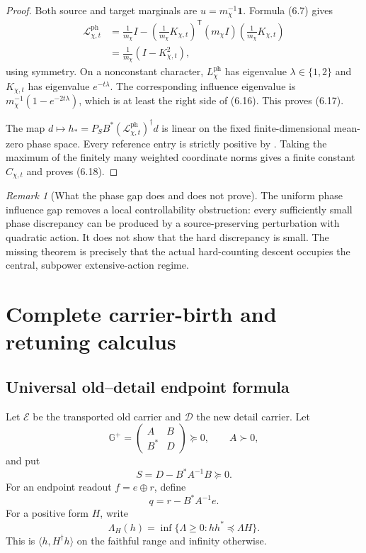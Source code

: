 \documentclass[11pt]{article}
\theoremstyle{definition}
\theoremstyle{remark}
\newtheorem{remark}[theorem]{Remark}
\newcommand{\one}{\mathbf 1}
\newcommand{\Phase}{\mathrm{ph}}
\begin{document}
\begin{proof}
Both source and target marginals are $u=m_\chi^{-1}\one$.  Formula
\textup{(6.7)} gives
\[
 \begin{aligned}
 \mathcal L_{\chi,t}^{\Phase}
 &=\frac1{m_\chi}I
  -\left(\frac1{m_\chi}K_{\chi,t}\right)^\mathsf T
   (m_\chi I)
   \left(\frac1{m_\chi}K_{\chi,t}\right)\\
 &=\frac1{m_\chi}(I-K_{\chi,t}^2),
 \end{aligned}
\]
using symmetry.  On a nonconstant character,
$L_\chi^{\Phase}$ has eigenvalue $\lambda\in\{1,2\}$ and
$K_{\chi,t}$ has eigenvalue $e^{-t\lambda}$.  The corresponding influence
eigenvalue is
$m_\chi^{-1}(1-e^{-2t\lambda})$, which is at least the right side of
\textup{(6.16)}.  This proves \textup{(6.17)}.

The map
$d\mapsto h_*=P_SB^*(\mathcal L_{\chi,t}^{\Phase})^\dagger d$ is linear on
the fixed finite-dimensional mean-zero phase space.  Every reference entry is
strictly positive by .  Taking the maximum
of the finitely many weighted coordinate norms gives a finite constant
$C_{\chi,t}$ and proves \textup{(6.18)}.
\end{proof}

\begin{remark}[What the phase gap does and does not prove]
The uniform phase influence gap removes a local controllability obstruction:
every sufficiently small phase discrepancy can be produced by a
source-preserving perturbation with quadratic action.  It does not show that
the hard discrepancy is small.  The missing theorem is precisely that the
actual hard-counting descent occupies the central, subpower extensive-action
regime.
\end{remark}


\section{Complete carrier-birth and retuning calculus}
\label{sec:grh-birth-retuning}
\subsection{Universal old--detail endpoint formula}
\label{subsec:birth-block-formula}

Let \(\mathcal E\) be the transported old carrier and \(\mathcal D\) the new
detail carrier.  Let
\[
 \mathbb G^+
 =\begin{pmatrix}A&B\\ B^*&D\end{pmatrix}\succeq0,
 \qquad A\succ0,
 \tag{T.3}
\]
and put
\[
 \boxed{S=D-B^*A^{-1}B\succeq0.}
 \tag{T.4}
\]
For an endpoint readout \(f=e\oplus r\), define
\[
 \boxed{q=r-B^*A^{-1}e.}
 \tag{T.5}
\]
For a positive form \(H\), write
\[
 \Lambda_H(h)=\inf\{\Lambda\ge0:hh^*\preceq\Lambda H\}.
 \tag{T.6}
\]
This is \(\langle h,H^\dagger h\rangle\) on the faithful range and infinity
otherwise.
\end{document}

